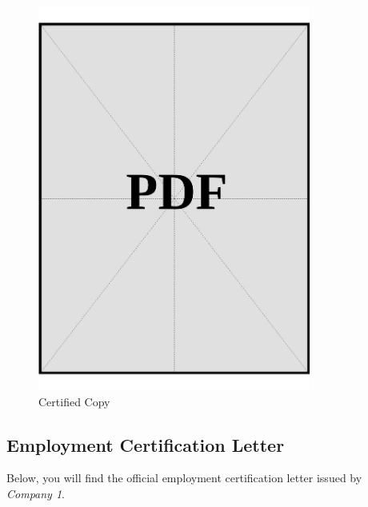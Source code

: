 \clearpage
\vspace*{\fill}

\begin{figure}[ht]
  \centering
  \includegraphics[page=1, width=0.8\textwidth]{../docs/applicant/employment/company-1/insurance-records/certified-copies.pdf}
  \caption{Certified Copy}
  \label{pdf:company-1-insurance-certified-copy}
\end{figure}
\vspace*{\fill}

\clearpage

\subsection*{Employment Certification Letter}\label{ssec:company-1-certificate}

Below, you will find the official employment certification letter issued by \textit{Company 1}.

